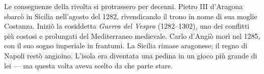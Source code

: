 Le conseguenze della rivolta si protrassero per decenni. Pietro III
d'Aragona sbarcò in Sicilia nell'agosto del 1282, rivendicando il trono
in nome di sua moglie Costanza. Iniziò la cosiddetta \textit{Guerra del
Vespro} (1282–1302), uno dei conflitti più costosi e prolungati del
Mediterraneo medievale. Carlo d'Angiò morì nel 1285, con il suo sogno
imperiale in frantumi. La Sicilia rimase aragonese; il regno di Napoli
restò angioino. L'isola era diventata una pedina in un gioco più grande
di lei — ma questa volta aveva scelto da che parte stare.


\filettodoppio

